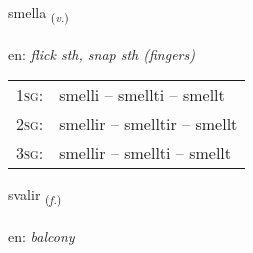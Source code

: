 \documentclass[frontgrid, backgrid]{flacards}\usepackage[]{graphicx}\usepackage[]{xcolor}
\begin{document}
\renewcommand{\flhead}{\vskip5pt \fboxsep=0pt {\small\bfseries\footnotesize Sagnorð | Verb}}
\renewcommand{\fcfoot}{\vskip5pt \fboxsep=0pt \hspace{2pt}{\small\bfseries\footnotesize 3K}}

\renewcommand{\blhead}{\vskip5pt {\small\bfseries\footnotesize Sagnorð | Verb }}
\renewcommand{\bcfoot}{\vskip5pt \hspace{2pt}{\small\bfseries\footnotesize 3K}}


{smella \small{\textsubscript{(\textit{v.})}} \\[1ex] %
\textphonetic{[smɛtla]} \\
en: \emph{flick sth, snap sth (fingers)} \\  [2ex]
\renewcommand*{\arraystretch}{0.8}
\begin{tabular}{p{1cm}l}
\textsc{1sg}: & smelli -- smellti -- smellt \\ 
\textsc{2sg}: & smellir -- smelltir -- smellt \\ 
\textsc{3sg}: & smellir -- smellti -- smellt \\ 
\end{tabular}
}

\renewcommand{\flhead}{\vskip5pt \fboxsep=0pt {\small\bfseries\footnotesize Nafnorð | Noun}}
\renewcommand{\fcfoot}{\vskip5pt \fboxsep=0pt \hspace{2pt}{\small\bfseries\footnotesize 3K}}

\renewcommand{\blhead}{\vskip5pt {\small\bfseries\footnotesize Nafnorð | Noun }}
\renewcommand{\bcfoot}{\vskip5pt \hspace{2pt}{\small\bfseries\footnotesize 3K}}


{svalir \small{\textsubscript{(\textit{f.})}} \\[1ex] %
\textphonetic{[svaːlɪr]} \\
en: \emph{balcony} \\  [2ex]
\renewcommand*{\arraystretch}{0.8}
}
\end{document}
